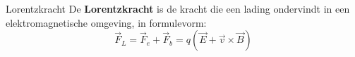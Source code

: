 


\newpage

\begin{theo}[Lorentzkracht]{Lorentzkracht}
    De \textbf{Lorentzkracht} is de kracht die een lading ondervindt in een elektromagnetische omgeving, in formulevorm:
    \begin{equation*}
        \Vec{F}_L = \Vec{F}_e + \Vec{F}_b = q(\Vec{E} + \Vec{v} \times \Vec{B})
    \end{equation*}
    \vspace{-0.5cm}
\end{theo}


